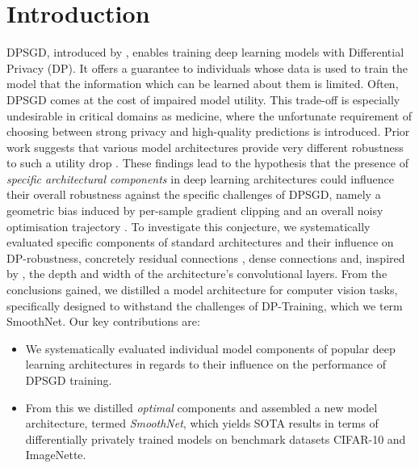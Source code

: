 \documentclass[nohyperref]{article}
\theoremstyle{plain}
\theoremstyle{definition}
\theoremstyle{remark}
\begin{document}
\section{Introduction}
\gls{DPSGD}, introduced by \citeauthor{abadi2016deep}, enables training deep learning models with Differential Privacy (DP). It offers a guarantee to individuals whose data is used to train the model that the information which can be learned about them is limited. Often, \acs{DPSGD} comes at the cost of impaired model utility. This trade-off is especially undesirable in critical domains as medicine, where the unfortunate requirement of choosing between strong privacy and high-quality predictions is introduced. Prior work suggests that various model architectures provide very different robustness to such a utility drop \cite{papernot2019making, morsbach2021architecture, ziller2021differentially}. These findings lead to the hypothesis that the presence of \textit{specific architectural components} in deep learning architectures could influence their overall robustness against the specific challenges of \acs{DPSGD}, namely a geometric bias induced by per-sample gradient clipping \citep{chen2020understanding} and an overall noisy optimisation trajectory \citep{dormann2021not}.     
To investigate this conjecture, we systematically evaluated specific components of standard architectures and their influence on \acs{DP}-robustness, concretely residual connections \citep{he2016deep}, dense connections \citep{huang2017densely} and, inspired by \citet{tan2019efficientnet}, the depth and width of the architecture's convolutional layers. From the conclusions gained, we distilled a model architecture for computer vision tasks, specifically designed to withstand the challenges of \acs{DP}-Training, which we term SmoothNet.
Our key contributions are:
\begin{itemize}
    \item We systematically evaluated individual model components of popular deep learning architectures in regards to their influence on the performance of \acs{DPSGD} training.
    \item From this we distilled \textit{optimal} components and assembled a new model architecture, termed \textit{SmoothNet}, which yields SOTA results in terms of differentially privately trained models on benchmark datasets CIFAR-10 and ImageNette. 
\end{itemize}
\end{document}
